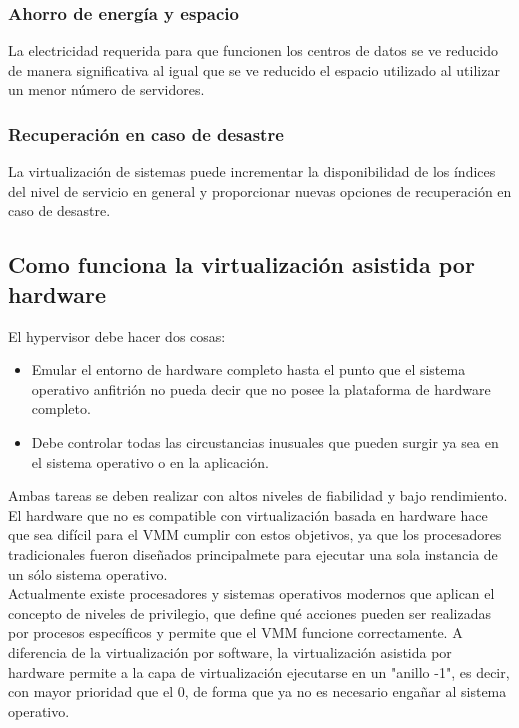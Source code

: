 \documentclass[10pt,a4paper,spanish]{report}
\begin{document}
  \subsubsection{Ahorro de energía y espacio}

  \noindent
  La electricidad requerida para que funcionen los centros de datos se ve reducido de manera significativa al igual que se ve reducido el espacio utilizado al utilizar un menor número de servidores.

  \subsubsection{Recuperación en caso de desastre}

  \noindent
  La virtualización de sistemas puede incrementar la disponibilidad de los índices del nivel de servicio en general y proporcionar nuevas opciones de recuperación en caso de desastre.

  \subsection{Como funciona la virtualización asistida por hardware}

  \noindent
  El hypervisor debe hacer dos cosas:
  \begin{itemize}
    \item Emular el entorno de hardware completo hasta el punto que el sistema operativo anfitrión no pueda decir que no posee la plataforma de hardware completo.
    \item Debe controlar todas las circustancias inusuales que pueden surgir ya sea en el sistema operativo o en la aplicación.
  \end{itemize}

  \noindent
  Ambas tareas se deben realizar con altos niveles de fiabilidad y bajo rendimiento. El hardware que no es compatible con virtualización basada en hardware hace que sea difícil para el VMM cumplir con estos objetivos, ya que los procesadores tradicionales fueron diseñados principalmete para ejecutar una sola instancia de un sólo sistema operativo. \\

  \noindent
  Actualmente existe procesadores y sistemas operativos modernos que aplican el concepto de niveles de privilegio, que define qué acciones pueden ser realizadas por procesos específicos y permite que el VMM funcione correctamente. A diferencia de la virtualización por software, la virtualización asistida por hardware permite a la capa de virtualización ejecutarse en un "anillo -1", es decir, con mayor prioridad que el 0, de forma que ya no es necesario engañar al sistema operativo. \\
\end{document}
